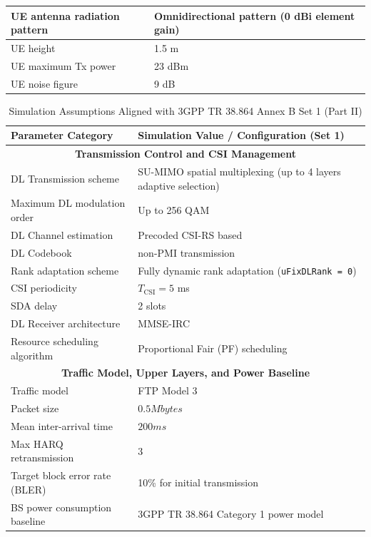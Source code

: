 \begin{table}[htbp]
\begin{tabularx}{\textwidth}{|p{}|X|}
UE antenna radiation pattern & Omnidirectional pattern (0 dBi element gain) \\ \hline
UE height & 1.5 m \\ \hline
UE maximum Tx power & 23 dBm \\ \hline
UE noise figure & 9 dB \\ \hline
\end{tabularx}
\end{table}

\clearpage %

\begin{table}[htbp]
\centering
\caption{Simulation Assumptions Aligned with 3GPP TR 38.864 Annex B Set 1 (Part II)}
\label{tab:appendix_3gpp_set1_part2}
\renewcommand{\arraystretch}{1.25}
\begin{tabularx}{\textwidth}{|p{}|X|}
\hline
\textbf{Parameter Category} & \textbf{Simulation Value / Configuration (Set 1)} \\ \hline
\multicolumn{2}{|c|}{\textbf{Transmission Control and CSI Management}} \\ \hline
DL Transmission scheme & SU-MIMO spatial multiplexing (up to 4 layers adaptive selection) \\ \hline
Maximum DL modulation order & Up to 256 QAM \\ \hline
DL Channel estimation & Precoded CSI-RS based \\ \hline
DL Codebook & non-PMI transmission \\ \hline
Rank adaptation scheme & Fully dynamic rank adaptation (\texttt{uFixDLRank = 0}) \\ \hline
CSI periodicity & $T_{\text{CSI}} = 5$ ms \\ \hline
SDA delay & 2 slots \\ \hline
DL Receiver architecture & MMSE-IRC \\ \hline
Resource scheduling algorithm & Proportional Fair (PF) scheduling \\ \hline
\multicolumn{2}{|c|}{\textbf{Traffic Model, Upper Layers, and Power Baseline}} \\ \hline
Traffic model & FTP Model 3 \\ \hline
Packet size & $0.5 Mbytes$ \\ \hline
Mean inter-arrival time & $200 ms$\\ \hline
Max HARQ retransmission & 3 \\ \hline
Target block error rate (BLER) & 10\% for initial transmission \\ \hline
BS power consumption baseline & 3GPP TR 38.864 Category 1 power model \\ \hline
\end{tabularx}
\end{table}